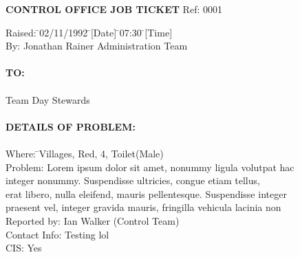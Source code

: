 \documentclass[13pt]{amsart}
\begin{document}
\sffamily
{}
\LARGE{\bfseries{CONTROL OFFICE JOB TICKET}} \qquad \Large{Ref: } \large{0001}
\begin{tabbing}
\Large{Raised:} \quad \= \large{02/11/1992} \qquad \= \quad \large{[Date]}  \qquad \=  \large{07:30} \qquad  \qquad \qquad \qquad \= \large{[Time]} \\
\Large{By:} \quad \> \large{Jonathan Rainer} \> \quad [Name] \qquad \> Administration Team \>  [Team] \\
\\
\LARGE{\bfseries{TO:}} \\
\\[-8pt]
\Large{Team} \quad \> \large{Day Stewards} \\
\\
\LARGE{\bfseries{DETAILS OF PROBLEM:}} \\
\\[-8pt]
\Large{Where:} \qquad\quad\= \large{Villages, Red, 4, Toilet(Male)} \\
\Large{Problem:} \> \large{Lorem ipsum dolor sit amet, nonummy ligula volutpat hac} \\ \> \large{integer nonummy. Suspendisse ultricies, congue etiam tellus,} \\ \> \large{erat libero, nulla eleifend, mauris pellentesque. Suspendisse integer} \\ \> \large{praesent vel, integer gravida mauris, fringilla vehicula lacinia non}\\[7pt]
\Large{Reported by:} \> \large{Ian Walker (Control Team)}\\
\Large{Contact Info:} \> \large{Testing lol} \\
\Large{CIS:} \> \large{Yes}
\end{tabbing}
\end{document}
